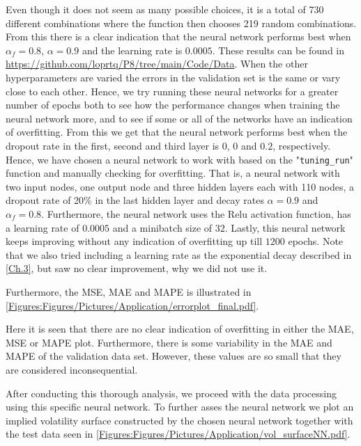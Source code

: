 Even though it does not seem as many possible choices, it is a total of 730 different combinations where the function then chooses 219 random combinations. From this there is a clear indication that the neural network performs best when $\alpha_f = 0.8$, $\alpha = 0.9$ and the learning rate is $0.0005$. These results can be found in \url{https://github.com/loprtq/P8/tree/main/Code/Data}. When the other hyperparameters are varied the errors in the validation set is the same or vary close to each other. Hence, we try running these neural networks for a greater number of epochs both to see how the performance changes when training the neural network more, and to see if some or all of the networks have an indication of overfitting. From this we get that the neural network performs best when the dropout rate in the first, second and third layer is $0$, $0$ and $0.2$, respectively. Hence, we have chosen a neural network to work with based on the "\lstinline{tuning_run}" function and manually checking for overfitting. That is, a neural network with two input nodes, one output node and three hidden layers each with 110 nodes, a dropout rate of 20\% in the last hidden layer and decay rates $\alpha = 0.9$ and $\alpha_f = 0.8$. Furthermore, the neural network uses the Relu activation function, has a learning rate of $0.0005$ and a minibatch size of $32$. Lastly, this neural network keeps improving without any indication of overfitting up till $1200$ epochs. Note that we also tried including a learning rate as the exponential decay described in \autoref{Ch.3}, but saw no clear improvement,  why we did not use it.

Furthermore, the MSE, MAE and MAPE is illustrated in \autoref{Figures:Figures/Pictures/Application/errorplot_final.pdf}.

Here it is seen that there are no clear indication of overfitting in either the MAE, MSE or MAPE plot. Furthermore, there is some variability in the MAE and MAPE of the validation data set. However, these values are so small that they are considered inconsequential. 

After conducting this thorough analysis, we proceed with the data processing using this specific neural network. To further asses the neural network we plot an implied volatility surface constructed by the chosen neural network together with the test data seen in \autoref{Figures:Figures/Pictures/Application/vol_surfaceNN.pdf}. 

